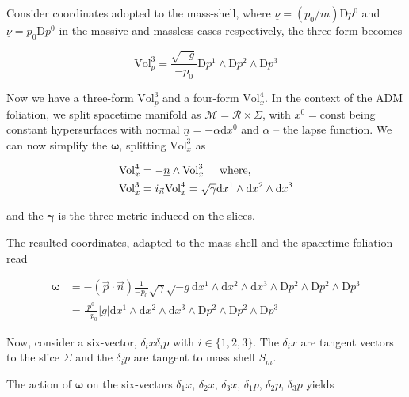 Consider coordinates adopted to the mass-shell, where $\underline{\nu} = (p_0/m)\text{D}p^0$ and $\underline{\nu} = p_0\text{D}p^0$ in the massive and massless cases respectively, the three-form becomes

\begin{equation}
\text{Vol}^3 _p =\frac{\sqrt{-g}}{-p_0}\text{D}p^1\wedge\text{D}p^2\wedge\text{D}p^3
\end{equation}

Now we have a three-form $\text{Vol}^3 _p$ and a four-form $\text{Vol}_x ^4$. 
In the context of the ADM foliation, we split spacetime manifold as $\mathcal{M}=\mathcal{R}\times\Sigma$, with $x^0 = \text{const}$ being constant hypersurfaces with normal $\underline{n} = - \alpha\text{d}x^0$ and $\alpha$ -- the lapse function. We can now simplify the $\boldsymbol{\omega}$, splitting $\text{Vol}_x ^3$ as 

\begin{align}
\text{Vol}_x ^4 &= -\underline{n}\wedge\text{Vol}_x ^3 \hspace{5mm} \text{where,} \\
\text{Vol}_x ^3 &= i_{\vec{n}}\text{Vol}_x ^4 = \sqrt{\gamma}\text{d}x^1\wedge\text{d}x^2\wedge\text{d}x^3
\end{align}

and the $\boldsymbol{\gamma}$ is the three-metric induced on the slices.

The resulted coordinates, adapted to the mass shell and the spacetime foliation read

\begin{align}
\boldsymbol{\omega} &=-(\vec{p}\cdot\vec{n})\frac{1}{-p_0}\sqrt{\gamma}\sqrt{-g}\text{d}x^1\wedge\text{d}x^2\wedge\text{d}x^3 \wedge\text{D}p^2\wedge\text{D}p^2\wedge\text{D}p^3 \\
&= \frac{p^0}{-p_0}|g|\text{d}x^1 \wedge\text{d}x^2\wedge\text{d}x^3 \wedge\text{D}p^2\wedge\text{D}p^2\wedge\text{D}p^3
\end{align}

Now, consider a six-vector, $\delta_i x \delta_i p$ with $i\in\{1,2,3\}$. 
The $\delta_i x$ are tangent vectors to the slice $\Sigma$ and the $\delta_i p$ are tangent to mass shell $S_m$.

The action of $\boldsymbol{\omega}$ on the six-vectors $\delta_1 x$, $\delta_2 x$, $\delta_3 x$, $\delta_1 p$, $\delta_2 p$, $\delta_3 p$ yields

